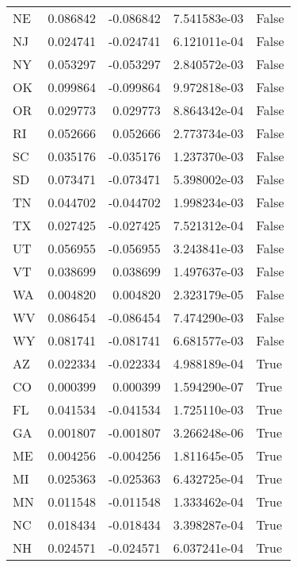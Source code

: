 \begin{table}
\begin{tabular}{lrrrl}
      NE &   0.086842 & -0.086842 &   7.541583e-03 &         False \\
      NJ &   0.024741 & -0.024741 &   6.121011e-04 &         False \\
      NY &   0.053297 & -0.053297 &   2.840572e-03 &         False \\
      OK &   0.099864 & -0.099864 &   9.972818e-03 &         False \\
      OR &   0.029773 &  0.029773 &   8.864342e-04 &         False \\
      RI &   0.052666 &  0.052666 &   2.773734e-03 &         False \\
      SC &   0.035176 & -0.035176 &   1.237370e-03 &         False \\
      SD &   0.073471 & -0.073471 &   5.398002e-03 &         False \\
      TN &   0.044702 & -0.044702 &   1.998234e-03 &         False \\
      TX &   0.027425 & -0.027425 &   7.521312e-04 &         False \\
      UT &   0.056955 & -0.056955 &   3.243841e-03 &         False \\
      VT &   0.038699 &  0.038699 &   1.497637e-03 &         False \\
      WA &   0.004820 &  0.004820 &   2.323179e-05 &         False \\
      WV &   0.086454 & -0.086454 &   7.474290e-03 &         False \\
      WY &   0.081741 & -0.081741 &   6.681577e-03 &         False \\
      AZ &   0.022334 & -0.022334 &   4.988189e-04 &          True \\
      CO &   0.000399 &  0.000399 &   1.594290e-07 &          True \\
      FL &   0.041534 & -0.041534 &   1.725110e-03 &          True \\
      GA &   0.001807 & -0.001807 &   3.266248e-06 &          True \\
      ME &   0.004256 & -0.004256 &   1.811645e-05 &          True \\
      MI &   0.025363 & -0.025363 &   6.432725e-04 &          True \\
      MN &   0.011548 & -0.011548 &   1.333462e-04 &          True \\
      NC &   0.018434 & -0.018434 &   3.398287e-04 &          True \\
      NH &   0.024571 & -0.024571 &   6.037241e-04 &          True \\

\end{tabular}
\end{table}
